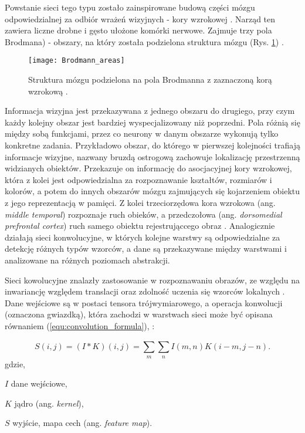 {\parindent0pt %
Powstanie sieci tego typu zostało zainspirowane budową części mózgu odpowiedzialnej za odbiór wrażeń wizyjnych - kory wzrokowej \cite{Matsugu2003SubjectIF}. Narząd ten zawiera liczne drobne i gęsto ułożone komórki nerwowe. Zajmuje trzy pola Brodmana) - obszary, na który została podzielona struktura mózgu (Rys. \ref{fig:brodmann_areas}) \cite{Brodmann1985VergleichendeLD}. 

\begin{figure}[h!]
	\centering
	\centering
		\texttt{[image: Brodmann\_areas]}	
	\caption{Struktura mózgu podzielona na pola Brodmanna z zaznaczoną korą wzrokową \cite{brodmann_areas}.}
	\label{fig:brodmann_areas}
\end{figure}

Informacja wizyjna jest przekazywana z jednego obszaru do drugiego, przy czym każdy kolejny obszar jest bardziej wyspecjalizowany niż poprzedni. Pola różnią się między sobą funkcjami, przez co neurony w danym obszarze wykonują tylko konkretne zadania. Przykładowo obszar, do którego w pierwszej kolejności trafiają informacje wizyjne, nazwany bruzdą ostrogową zachowuje lokalizację przestrzenną widzianych obiektów. Przekazuje on informację do asocjacyjnej kory wzrokowej, która z kolei jest odpowiedzialna za rozpoznawanie kształtów, rozmiarów i kolorów, a potem do innych obszarów mózgu zajmujących się kojarzeniem obiektu z jego reprezentacją w pamięci. Z kolei trzeciorzędowa kora wzrokowa (ang. \textit{middle temporal}) rozpoznaje ruch obieków, a przedczołowa (ang. \textit{dorsomedial prefrontal cortex}) ruch samego obiektu rejestrująccego obraz \cite{cnn_website}. Analogicznie działają sieci konwolucyjne, w których kolejne warstwy są odpowiedzialne za detekcję różnych typów wzorców, a dane są przekazywane między warstwami i analizowane na różnych poziomach abstrakcji.

Sieci kowolucyjne znalazły zastosowanie w rozpoznawaniu obrazów, ze względu na inwariancję względem translacji oraz zdolność uczenia się wzorców lokalnych \cite{Chollet2017DeepLW}. Dane wejściowe są w postaci tensora trójwymiarowego, a operacja konwolucji (oznaczona gwiazdką), która zachodzi w warstwach sieci może być opisana równaniem (\ref{equ:convolution_formula}), \cite{deep_learning}:

\begin{equation}
S(i,j) = (I * K)(i,j) = \sum_{m}^{}\sum_{n}^{} I(m,n)K(i-m,j-n).
\label{equ:convolution_formula}
\end{equation}
gdzie,
\begin{eqwhere}[2cm]
	\item[$I$] dane wejściowe,
	\item[$K$] jądro (ang. \textit{kernel}),
	\item[$S$] wyjście, mapa cech (ang. \textit{feature map}).
\end{eqwhere}
}

